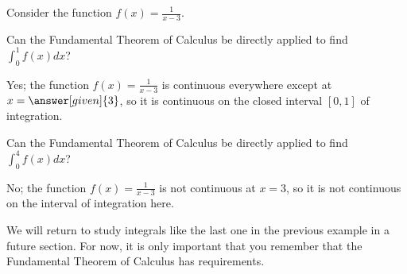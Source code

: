 \documentclass[nooutcomes]{ximera}
\begin{document}
\begin{example}
Consider the function $f(x) = \frac{1}{x-3}$.  

Can the Fundamental Theorem of Calculus be directly applied to find $\int_0^1 f(x) dx$?

\begin{explanation}
Yes; the function $f(x) = \frac{1}{x-3}$ is continuous everywhere except at $x=\answer[given]{3}$, so it is continuous on the closed interval $[0,1]$ of integration. 
\end{explanation}

Can the Fundamental Theorem of Calculus be directly applied to find $\int_0^4 f(x) dx$?

\begin{explanation}
No; the function $f(x) = \frac{1}{x-3}$ is not continuous at $x=3$, so it is not continuous on the interval of integration here. 
\end{explanation}

\end{example}

\begin{remark}
We will return to study integrals like the last one in the previous example in a future section.  For now, it is only important that you remember that the Fundamental Theorem of Calculus has requirements.
\end{remark}
\end{document}
